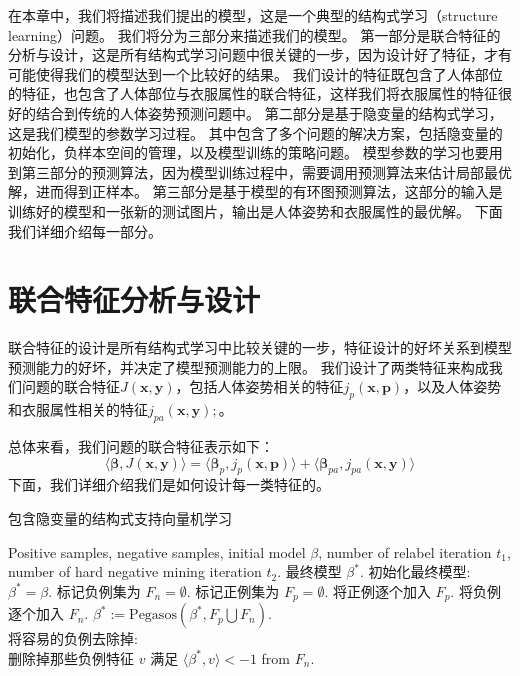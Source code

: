 在本章中，我们将描述我们提出的模型，这是一个典型的结构式学习（structure learning）问题。
我们将分为三部分来描述我们的模型。
第一部分是联合特征的分析与设计，这是所有结构式学习问题中很关键的一步，因为设计好了特征，才有可能使得我们的模型达到一个比较好的结果。
我们设计的特征既包含了人体部位的特征，也包含了人体部位与衣服属性的联合特征，这样我们将衣服属性的特征很好的结合到传统的人体姿势预测问题中。
第二部分是基于隐变量的结构式学习，这是我们模型的参数学习过程。
其中包含了多个问题的解决方案，包括隐变量的初始化，负样本空间的管理，以及模型训练的策略问题。
模型参数的学习也要用到第三部分的预测算法，因为模型训练过程中，需要调用预测算法来估计局部最优解，进而得到正样本。
第三部分是基于模型的有环图预测算法，这部分的输入是训练好的模型和一张新的测试图片，输出是人体姿势和衣服属性的最优解。
下面我们详细介绍每一部分。

\section{联合特征分析与设计}
联合特征的设计是所有结构式学习中比较关键的一步\cite{svm-struct}，特征设计的好坏关系到模型预测能力的好坏，并决定了模型预测能力的上限。
我们设计了两类特征来构成我们问题的联合特征$J(\mathbf{x}, \mathbf{y})$，包括人体姿势相关的特征$j_p(\mathbf{x}, \mathbf{p})$，以及人体姿势和衣服属性相关的特征$j_{pa}(\mathbf{x}, \mathbf{y});$。

总体来看，我们问题的联合特征表示如下：
\begin{equation}
    \label{eq:feature}
    \langle \mathbf{\beta}, J(\mathbf{x},\mathbf{y}) \rangle = \langle \mathbf{\beta}_p, j_p(\mathbf{x}, \mathbf{p}) \rangle + \langle \mathbf{\beta}_{pa}, j_{pa}(\mathbf{x},\mathbf{y}) \rangle
\end{equation}
下面，我们详细介绍我们是如何设计每一类特征的。




\begin{algorithm}
\caption{包含隐变量的结构式支持向量机学习}
\begin{algorithmic}[1]
    \REQUIRE Positive samples, negative samples, initial model $\beta$, number of relabel iteration $t_1$, number of hard negative mining iteration $t_2$.
    \ENSURE 最终模型 ${\beta}^*$.
    \STATE 初始化最终模型: ${\beta}^* = \beta$.
    \STATE 标记负例集为 $F_n = \emptyset$.
        \STATE 标记正例集为 $F_p = \emptyset$.
        \STATE 将正例逐个加入 $F_p$.
            \STATE 将负例逐个加入 $F_n$.
            \STATE ${\beta}^* := \mathrm{Pegasos}({\beta}^*, F_p \bigcup F_n)$.\\
            \STATE 将容易的负例去除掉: \\
             删除掉那些负例特征 $v$ 满足 $\langle{\beta}^*, v \rangle < -1$ from $F_n$.
        \ENDFOR
    \ENDFOR
\end{algorithmic}
\label{alg:train}
\end{algorithm}


